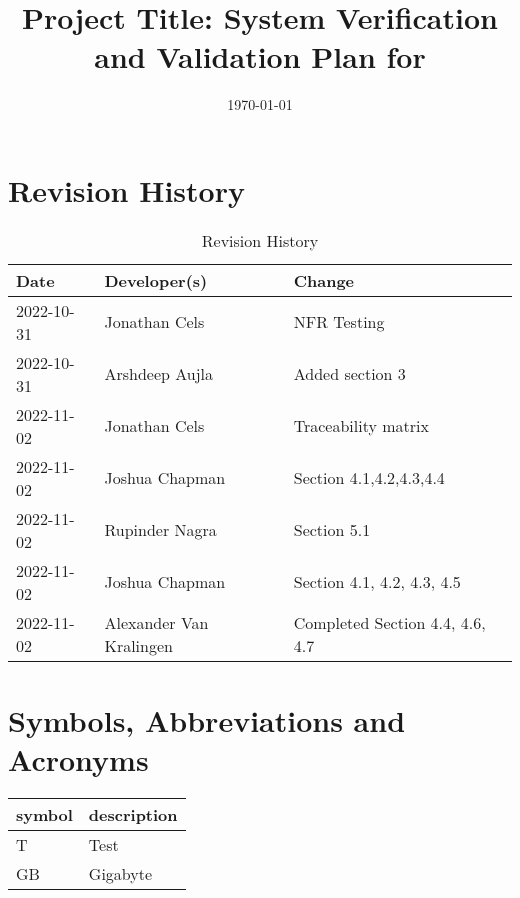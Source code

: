 \documentclass[12pt, titlepage]{article}
\begin{document}
\title{Project Title: System Verification and Validation Plan for \progname{}} 
\author{\authname}
\date{\today}
	
\maketitle


\section{Revision History}

\begin{table}[hp]
\caption{Revision History} \label{TblRevisionHistory}
\begin{tabularx}{\textwidth}{llX}
\toprule
\textbf{Date} & \textbf{Developer(s)} & \textbf{Change}\\
\midrule
2022-10-31 & Jonathan Cels & NFR Testing\\
2022-10-31 & Arshdeep Aujla & Added section 3\\
2022-11-02 & Jonathan Cels & Traceability matrix\\
2022-11-02 & Joshua Chapman & Section 4.1,4.2,4.3,4.4\\
2022-11-02 & Rupinder Nagra & Section 5.1\\
2022-11-02 & Joshua Chapman & Section 4.1, 4.2, 4.3, 4.5\\
2022-11-02 & Alexander Van Kralingen & Completed Section 4.4, 4.6, 4.7\\
\bottomrule
\end{tabularx}
\end{table}

\newpage

\tableofcontents

\newpage

\section{Symbols, Abbreviations and Acronyms}

\renewcommand{\arraystretch}{1.2}
\begin{tabular}{l l} 
  \toprule		
  \textbf{symbol} & \textbf{description}\\
  \midrule 
  T & Test\\
  GB & Gigabyte\\
  \bottomrule
\end{tabular}\\
\end{document}
